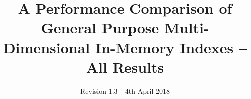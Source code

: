 \documentclass{vldb}
\begin{document}
\title{A Performance Comparison of General Purpose Multi-Dimensional In-Memory Indexes -- All Results}
\subtitle{Revision 1.3 -- 4th April 2018}


%
%
%
%
%

%
\end{document}
